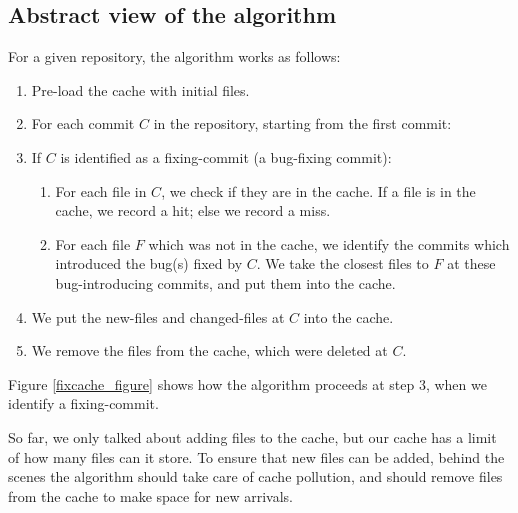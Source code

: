 \documentclass[12pt,twoside,notitlepage]{report}
\begin{document}
\subsection{Abstract view of the algorithm}
For a given repository, the algorithm works as follows:
\begin{enumerate}
	\item Pre-load the cache with initial files.
	\item For each commit $C$ in the repository, starting from the first commit:
	
	\item If $C$ is identified as a fixing-commit (a bug-fixing commit):
	\begin{enumerate}
	\item \label{lookup} For each file in $C$, we check if they are in the cache. If a file is in the cache, we record a hit; else we record a miss.
	\item For each file $F$ which was not in the cache, we identify the commits which introduced the bug(s) fixed by $C$. We take the closest files to $F$ at these bug-introducing commits, and put them into the cache.
	\end{enumerate}
	\item We put the new-files and changed-files at $C$ into the cache.
	\item We remove the files from the cache, which were deleted at $C$.
\end{enumerate}

Figure \ref{fixcache_figure} shows how the algorithm proceeds at step 3, when we identify a fixing-commit.

So far, we only talked about adding files to the cache, but our cache has a limit of how many files can it store. To ensure that new files can be added, behind the scenes the algorithm should take care of cache pollution, and should remove files from the cache to make space for new arrivals.
\end{document}

